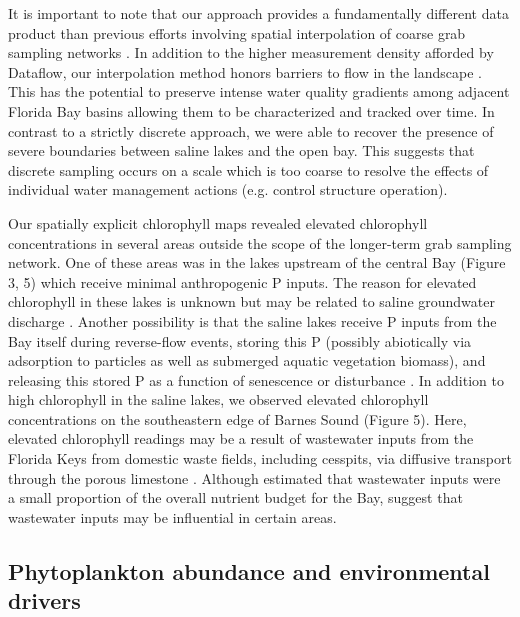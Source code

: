 It is important to note that our approach provides a fundamentally different data product than previous efforts involving spatial interpolation of coarse grab sampling networks \citep{fourqurean1993process}. In addition to the higher measurement density afforded by Dataflow, our interpolation method honors barriers to flow in the landscape \citep{stachelek_application_2015}. This has the potential to preserve intense water quality gradients among adjacent Florida Bay basins allowing them to be characterized and tracked over time. In contrast to a strictly discrete approach, we were able to recover the presence of severe boundaries between saline lakes and the open bay. This suggests that discrete sampling occurs on a scale which is too coarse to resolve the effects of individual water management actions (e.g. control structure operation).

Our spatially explicit chlorophyll maps revealed elevated chlorophyll concentrations in several areas outside the scope of the longer-term grab sampling network. One of these areas was in the lakes upstream of the central Bay (Figure 3, 5) which receive minimal anthropogenic P inputs. The reason for elevated chlorophyll in these lakes is unknown but may be related to saline groundwater discharge \citep{price2006coastal}. Another possibility is that the saline lakes receive P inputs from the Bay itself during reverse-flow events, storing this P (possibly abiotically via adsorption to particles as well as submerged aquatic vegetation biomass), and releasing this stored P as a function of senescence or disturbance \citep{rudnick1999phosphorus}. In addition to high chlorophyll in the saline lakes, we observed elevated chlorophyll concentrations on the southeastern edge of Barnes Sound (Figure 5). Here, elevated chlorophyll readings may be a result of wastewater inputs from the Florida Keys from domestic waste fields, including cesspits, via diffusive transport through the porous limestone \citep{rudnick1999phosphorus}. Although \citet{rudnick1999phosphorus} estimated that wastewater inputs were a small proportion of the overall nutrient budget for the Bay, \citet{szmant1996water} suggest that wastewater inputs may be influential in certain areas.

\subsection{Phytoplankton abundance and environmental drivers}
\label{phytoabund}

